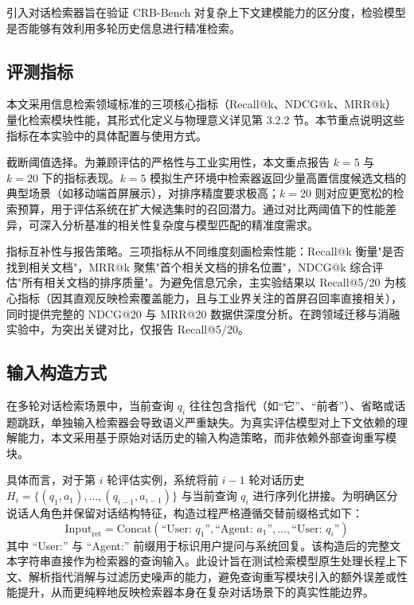 引入对话检索器旨在验证 CRB-Bench 对复杂上下文建模能力的区分度，检验模型是否能够有效利用多轮历史信息进行精准检索。




\subsection{评测指标}
\label{subsec:metrics_config}

本文采用信息检索领域标准的三项核心指标（Recall@k、NDCG@k、MRR@k）量化检索模块性能，其形式化定义与物理意义详见第 3.2.2 节。本节重点说明这些指标在本实验中的具体配置与使用方式。

截断阈值选择。为兼顾评估的严格性与工业实用性，本文重点报告 $k=5$ 与 $k=20$ 下的指标表现。$k=5$ 模拟生产环境中检索器返回少量高置信度候选文档的典型场景（如移动端首屏展示），对排序精度要求极高；$k=20$ 则对应更宽松的检索预算，用于评估系统在扩大候选集时的召回潜力。通过对比两阈值下的性能差异，可深入分析基准的相关性复杂度与模型匹配的精准度需求。

指标互补性与报告策略。三项指标从不同维度刻画检索性能：Recall@k 衡量"是否找到相关文档"，MRR@k 聚焦"首个相关文档的排名位置"，NDCG@k 综合评估"所有相关文档的排序质量"。为避免信息冗余，主实验结果以 Recall@5/20 为核心指标（因其直观反映检索覆盖能力，且与工业界关注的首屏召回率直接相关），同时提供完整的 NDCG@20 与 MRR@20 数据供深度分析。在跨领域迁移与消融实验中，为突出关键对比，仅报告 Recall@5/20。







\subsection{输入构造方式}

在多轮对话检索场景中，当前查询 $q_i$ 往往包含指代（如“它”、“前者”）、省略或话题跳跃，单独输入检索器会导致语义严重缺失。为真实评估模型对上下文依赖的理解能力，本文采用基于原始对话历史的输入构造策略，而非依赖外部查询重写模块。

具体而言，对于第 $i$ 轮评估实例，系统将前 $i-1$ 轮对话历史 $H_i = \{(q_1, a_1), \dots, (q_{i-1}, a_{i-1})\}$ 与当前查询 $q_i$ 进行序列化拼接。为明确区分说话人角色并保留对话结构特征，构造过程严格遵循交替前缀格式如下：
\begin{equation}
    \text{Input}_{\text{ret}} = \text{Concat}(\text{``User: } q_1 \text{''}, \text{``Agent: } a_1 \text{''}, \dots, \text{``User: } q_i \text{''})
\end{equation}
其中 ``User:'' 与 ``Agent:'' 前缀用于标识用户提问与系统回复。该构造后的完整文本字符串直接作为检索器的查询输入。此设计旨在测试检索模型原生处理长程上下文、解析指代消解与过滤历史噪声的能力，避免查询重写模块引入的额外误差或性能提升，从而更纯粹地反映检索器本身在复杂对话场景下的真实性能边界。


